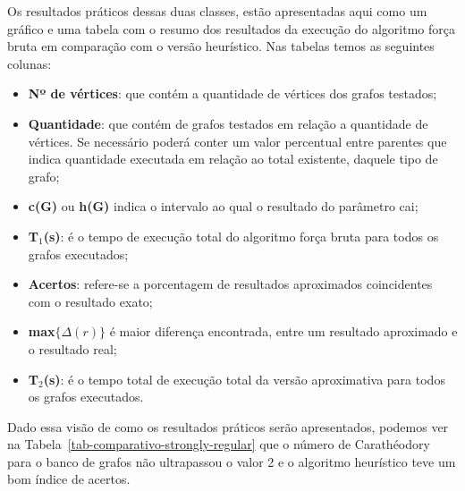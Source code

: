 Os resultados práticos dessas duas classes, estão apresentadas aqui como um gráfico e uma tabela com o resumo dos resultados da execução do algoritmo força bruta em comparação com o versão heurístico. Nas tabelas temos as seguintes colunas:
\begin{itemize}
   \item{\textbf{Nº de vértices}: que contém a quantidade de vértices dos grafos testados;}
   \item{\textbf{Quantidade}: que contém de grafos testados em relação a quantidade de vértices. Se necessário poderá
         conter um valor percentual entre parentes que indica  quantidade executada em relação ao total existente,
         daquele tipo de grafo;}
    \item{\textbf{c(G)} ou \textbf{h(G)} indica o intervalo ao qual o resultado do parâmetro cai;}
    \item{\textbf{T$_1$(s)}: é o tempo de execução total do algoritmo força bruta
           para todos os grafos executados;}
    \item{\textbf{Acertos}: refere-se a porcentagem de resultados aproximados coincidentes com o resultado exato;}
    \item{\textbf{max$\{\Delta (r)\}$} é maior diferença encontrada, entre um resultado aproximado e o resultado real;}
    \item{\textbf{T$_2$(s)}: é o tempo total de execução total da versão aproximativa para todos os grafos executados.}
\end{itemize}

Dado essa visão de como os resultados práticos serão apresentados, podemos ver na Tabela~\ref{tab-comparativo-strongly-regular} que o número de Carathéodory para o banco de grafos não ultrapassou o valor 2 e o algoritmo heurístico teve um bom índice de acertos.

